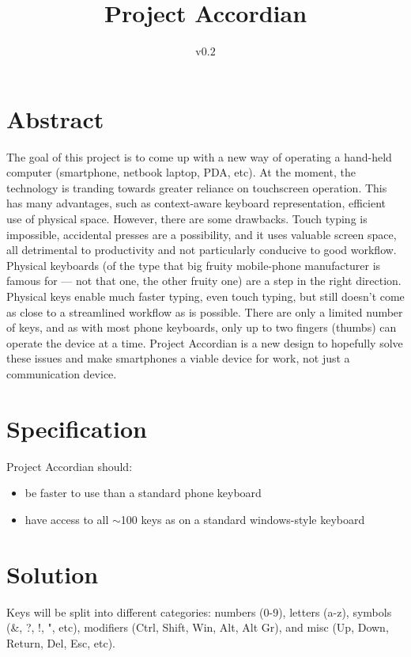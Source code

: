 \documentclass{article}
\title{Project Accordian}
\author{v$0.2$}
\begin{document}
\maketitle

\section{Abstract}
The goal of this project is to come up with a new way of operating a hand-held computer (smartphone, netbook laptop, PDA, etc). At the moment, the technology is tranding towards greater reliance on touchscreen operation. This has many advantages, such as context-aware keyboard representation, efficient use of physical space. However, there are some drawbacks. Touch typing is impossible, accidental presses are a possibility, and it uses valuable screen space, all detrimental to productivity and not particularly conducive to good workflow. Physical keyboards (of the type that big fruity mobile-phone manufacturer is famous for --- not that one, the other fruity one) are a step in the right direction. Physical keys enable much faster typing, even touch typing, but still doesn't come as close to a streamlined workflow as is possible. There are only a limited number of keys, and as with most phone keyboards, only up to two fingers (thumbs) can operate the device at a time. Project Accordian is a new design to hopefully solve these issues and make smartphones a viable device for work, not just a communication device.

\section{Specification}
Project Accordian should:
\begin{itemize}
\item be faster to use than a standard phone keyboard
\item have access to all $\sim$100 keys as on a standard windows-style keyboard
\end{itemize}

\section{Solution}
Keys will be split into different categories: numbers (0-9), letters (a-z), symbols (\&, ?, !, ", etc), modifiers (Ctrl, Shift, Win, Alt, Alt Gr), and misc (Up, Down, Return, Del, Esc, etc).
\end{document}
